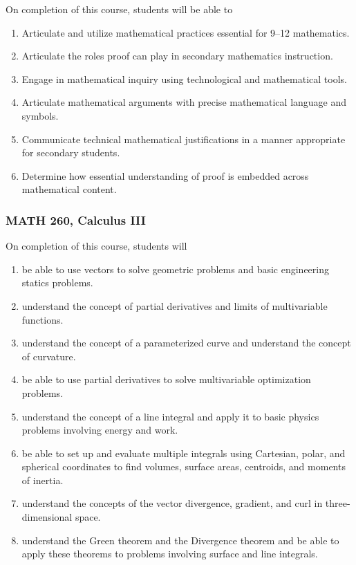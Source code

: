 \documentclass[11pt]{article}
\newenvironment{alphalist}{
\begin{enumerate}[label=(\arabic*),widest=107 ,leftmargin=25pt, itemsep=0pt]}
{\end{enumerate}}
\begin{document}
On completion of this course, students will be able to
\begin{alphalist}
\item Articulate and utilize mathematical practices essential for 9--12 mathematics.  
\item Articulate the roles proof can play in secondary mathematics instruction.
\item Engage in mathematical inquiry using technological and mathematical tools.
\item Articulate mathematical arguments with precise mathematical language and symbols.
\item Communicate technical mathematical justifications in a manner appropriate for secondary students.
\item Determine how essential understanding of proof is embedded across mathematical content.
\end{alphalist}

\subsubsection*{MATH 260, Calculus III}


On completion of this course, students will 
\begin{alphalist} 
    \item be able to use vectors to solve geometric problems and basic engineering statics problems.
    \item understand the concept of partial derivatives and limits of multivariable functions.
    \item understand the concept of a parameterized curve and understand the concept of curvature.
    \item be able to use partial derivatives to solve multivariable optimization problems.
    \item understand the concept of a line integral and apply it to basic physics problems involving energy and work.
    \item be able to set up and evaluate multiple integrals using Cartesian, polar, and spherical coordinates to find volumes, 
    surface areas, centroids, and moments of inertia.
    \item understand the concepts of the vector divergence, gradient, and curl in 
    three-dimensional space.
    \item understand the Green theorem and the Divergence theorem and be able to 
    apply these theorems to problems involving surface and line integrals.
\end{alphalist}
\end{document}
